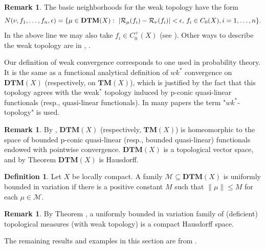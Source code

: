 \documentclass[sn-mathphys-num]{sn-jnl}%
\theoremstyle{thmstyleone}%
\theoremstyle{definition}
\newtheorem{definition}[theorem]{Definition}
\newtheorem{remark}[theorem]{Remark}
\begin{document}
\begin{remark} \label{rmwkbase}
The basic neighborhoods for the weak topology have the form 
$$N(\nu, f_1, \ldots, f_n, \epsilon) = \{ \mu \in \mathbf{DTM}(X): \ |\mathcal{R}_{\mu}(f_i) - \mathcal{R}_{\nu} (f_i) | < \epsilon, \, f_i \in C_0(X), \\
i=1, \ldots, n  \notag \}. $$
In the above line we may also take $f_i \in C_0^+(X)$ (see \cite[Sect. 2]{Butler:QLM}).  
Other ways to describe the weak topology are in \cite[Sect. 2]{Butler:WkConv},  \cite[Sect. 3]{Butler:QLM}.

Our definition of weak convergence corresponds to one used in probability theory. It is the same as a functional analytical definition of  $wk^*$ convergence
on $\mathbf{DTM}(X)$ (respectively, on $\mathbf{TM}(X)$), which is justified by the fact that this topology agrees with the weak$^*$ topology 
induced by p-conic quasi-linear functionals (resp., quasi-linear functionals). 
In many papers the term "$wk^*$-topology" is used. 
\end{remark}

\begin{remark}
By  \cite[Th. 8.7]{Butler:ReprDTM},  $ \mathbf{DTM}(X)$ (respectively, $ \mathbf{TM}(X)$)  is homeomorphic 
to the space of bounded p-conic quasi-linear (resp.,  bounded quasi-linear) functionals  endowed with pointwise convergence. 
$ \mathbf{DTM}(X)$ is a topological vector space, and  by Theorem \cite[Th. 2.4]{Butler:WkConv}  $ \mathbf{DTM}(X)$ is Hausdorff.
\end{remark}

\begin{definition} \label{unifbdv}
Let $X$ be locally compact.
A family $\mathcal{M}  \subseteq \mathbf{DTM}(X)$ is uniformly bounded in variation if there is a positive constant $M$ such that $ \| \mu \| \le M$ 
for each $\mu \in \mathcal{M} $. 
\end{definition}

\begin{remark} \label{McompT2} 
By Theorem \cite[Th. 2.4]{Butler:WkConv},  a uniformly bounded in variation family of (deficient) topological measures (with weak topology) is a 
compact Hausdorff space.
\end{remark}

The remaining results and examples in this section are from \cite[Sect. 3, Sect. 5]{Butler:QLM}.
\end{document}
